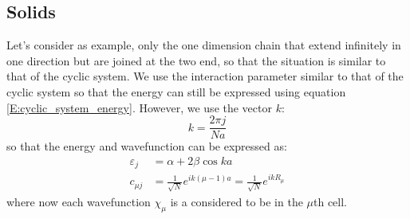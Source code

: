 \documentclass{article}
\begin{document}
\subsection{Solids}
Let's consider as example, only the one dimension chain that extend infinitely in one direction but are joined 
at the two end, so that the situation is similar to that of the cyclic system. 
We use the interaction parameter similar to that of the cyclic system so that the energy can still be 
expressed using equation \eqref{E:cyclic_system_energy}. However, we use the vector $k$:
\begin{equation}
    k = \frac{2\pi j}{Na}
\end{equation}
so that the energy and wavefunction can be expressed as:
\begin{align}
    \varepsilon_j &= \alpha + 2 \beta \cos ka \\ 
    c_{\mu j} &= \frac{1}{\sqrt{N}} e^{ik(\mu-1) a} = \frac{1}{\sqrt{N}} e^{ikR_{\mu}}
\end{align}
where now each wavefunction $\chi_{\mu}$ is a considered to be in the $\mu$th cell. 
\end{document}
